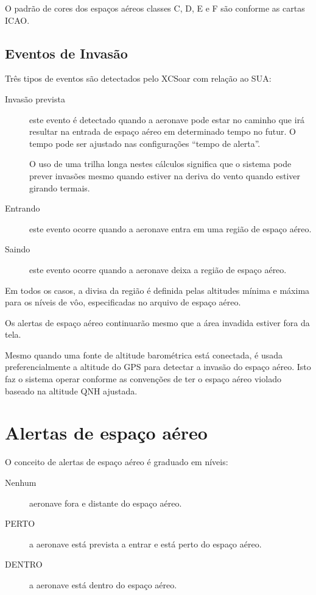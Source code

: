O padrão de cores dos espaços aéreos classes C, D, E e F são conforme as cartas ICAO. 


\subsection*{Eventos de Invasão}

Três tipos de eventos são detectados pelo XCSoar com relação ao SUA:
\begin{description}
\item[Invasão prevista] este evento é detectado quando a aeronave pode estar no caminho que irá resultar na entrada de espaço aéreo em determinado tempo no futur.  O tempo pode ser ajustado nas configurações “tempo de alerta”.

O uso de uma trilha longa nestes cálculos significa que o sistema pode prever invasões mesmo quando estiver na deriva do vento quando estiver girando termais.



\item[Entrando] este evento ocorre quando a aeronave entra em uma região de espaço aéreo.
\item[Saindo] este evento ocorre quando a aeronave deixa a região de espaço aéreo.
\end{description}
Em todos os casos, a divisa da região é definida pelas altitudes mínima e máxima para os níveis de vôo, especificadas no arquivo de espaço aéreo.

Os alertas de espaço aéreo continuarão mesmo que a área invadida estiver fora da tela.

Mesmo quando uma fonte de altitude barométrica está conectada, é usada preferencialmente a altitude do GPS para detectar a invasão do espaço aéreo.  Isto faz o sistema operar conforme as convenções de ter o espaço aéreo violado baseado na altitude QNH ajustada.



\section{Alertas de espaço aéreo }

O conceito de alertas de espaço aéreo é graduado em níveis:
\begin{description}
\item[Nenhum] aeronave fora e distante do espaço aéreo.
\item[\colorbox{AirspaceYellow}{PERTO}] a aeronave está prevista a entrar e está perto do espaço aéreo.
\item[\colorbox{AirspaceRed}{DENTRO}] a aeronave está dentro do espaço aéreo.
\end{description}

